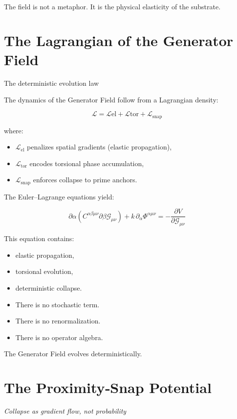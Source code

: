 \documentclass[reprint,amsmath,amssymb,aps,prl,floatfix]{revtex4-2}
\begin{document}
\begin{itemize}
The field is not a metaphor.  
It is the physical elasticity of the substrate.

\section{The Lagrangian of the Generator Field}

The deterministic evolution law
\medskip

The dynamics of the Generator Field follow from a Lagrangian density:

\[
\mathcal{L} = \mathcal{L}{\text{el}} + \mathcal{L}{\text{tor}} + \mathcal{L}_{\text{snap}}
\]

where:
\begin{itemize}
\item \(\mathcal{L}_{\text{el}}\) penalizes spatial gradients (elastic propagation),  
\item \(\mathcal{L}_{\text{tor}}\) encodes torsional phase accumulation,  
\item \(\mathcal{L}_{\text{snap}}\) enforces collapse to prime anchors.
\end{itemize}
\medskip

The Euler–Lagrange equations yield:

\[
\partial\alpha \left( C^{\alpha\beta\mu\nu} \partial\beta \mathcal{G}_{\mu\nu} \right)
+ k\, \partial_\alpha \Phi^{\alpha\mu\nu}
= -\frac{\partial V}{\partial \mathcal{G}_{\mu\nu}}
\]

This equation contains:
\begin{itemize}
\item elastic propagation,  
\item torsional evolution,  
\item deterministic collapse.
\end{itemize}
\medskip
\medskip
\begin{itemize}
\item There is no stochastic term.  
\item There is no renormalization.  
\item There is no operator algebra.
\end{itemize}
\medskip

The Generator Field evolves deterministically.

\section{The Proximity‑Snap Potential}
\textit{Collapse as gradient flow, not probability}


\end{itemize}
\end{document}
